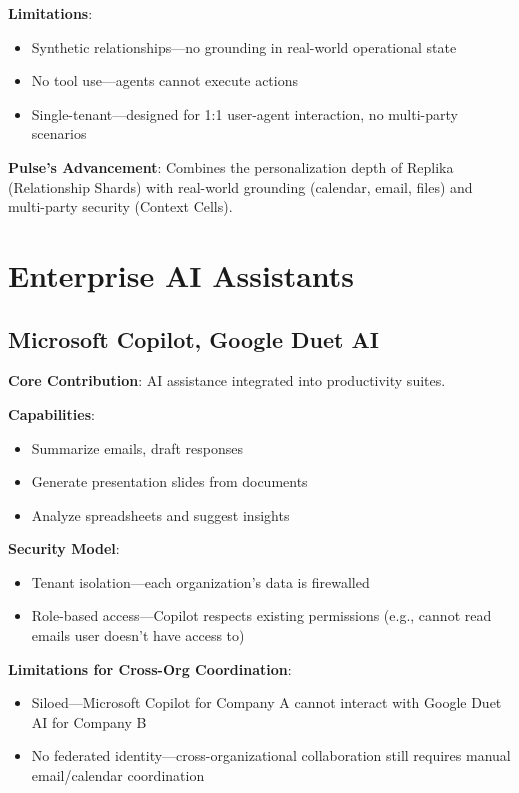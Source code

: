 \textbf{Limitations}:
\begin{itemize}
    \item Synthetic relationships—no grounding in real-world operational state
    \item No tool use—agents cannot execute actions
    \item Single-tenant—designed for 1:1 user-agent interaction, no multi-party scenarios
\end{itemize}

\textbf{Pulse's Advancement}: Combines the personalization depth of Replika (Relationship Shards) with real-world grounding (calendar, email, files) and multi-party security (Context Cells).

\section{Enterprise AI Assistants}

\subsection{Microsoft Copilot, Google Duet AI}

\textbf{Core Contribution}: AI assistance integrated into productivity suites.

\textbf{Capabilities}:
\begin{itemize}
    \item Summarize emails, draft responses
    \item Generate presentation slides from documents
    \item Analyze spreadsheets and suggest insights
\end{itemize}

\textbf{Security Model}:
\begin{itemize}
    \item Tenant isolation—each organization's data is firewalled
    \item Role-based access—Copilot respects existing permissions (e.g., cannot read emails user doesn't have access to)
\end{itemize}

\textbf{Limitations for Cross-Org Coordination}:
\begin{itemize}
    \item Siloed—Microsoft Copilot for Company A cannot interact with Google Duet AI for Company B
    \item No federated identity—cross-organizational collaboration still requires manual email/calendar coordination
\end{itemize}

